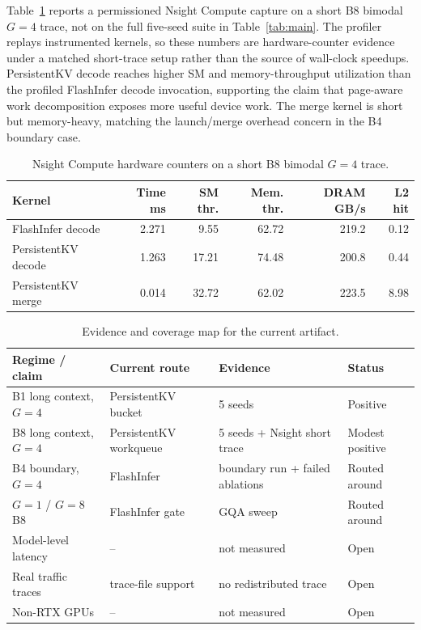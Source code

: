 \documentclass[10pt]{article}
\begin{document}
Table~\ref{tab:nsight} reports a permissioned Nsight Compute capture on a short
B8 bimodal $G=4$ trace, not on the full five-seed suite in
Table~\ref{tab:main}. The profiler replays instrumented kernels, so these
numbers are hardware-counter evidence under a matched short-trace setup rather
than the source of wall-clock speedups. PersistentKV decode reaches higher SM
and memory-throughput utilization than the profiled FlashInfer decode
invocation, supporting the claim that page-aware work decomposition exposes
more useful device work. The merge kernel is short but memory-heavy, matching
the launch/merge overhead concern in the B4 boundary case.

\begin{table}[t]
\centering
\caption{Nsight Compute hardware counters on a short B8 bimodal $G=4$ trace.}
\label{tab:nsight}
\small
\begin{tabular}{lrrrrr}
\toprule
Kernel & Time ms & SM thr. & Mem. thr. & DRAM GB/s & L2 hit \\
\midrule
FlashInfer decode & 2.271 & 9.55 & 62.72 & 219.2 & 0.12 \\
PersistentKV decode & 1.263 & 17.21 & 74.48 & 200.8 & 0.44 \\
PersistentKV merge & 0.014 & 32.72 & 62.02 & 223.5 & 8.98 \\
\bottomrule
\end{tabular}
\end{table}

\begin{table}[t]
\centering
\caption{Evidence and coverage map for the current artifact.}
\label{tab:coverage}
\small
\begin{tabular}{llll}
\toprule
Regime / claim & Current route & Evidence & Status \\
\midrule
B1 long context, $G=4$ & PersistentKV bucket & 5 seeds & Positive \\
B8 long context, $G=4$ & PersistentKV workqueue & 5 seeds + Nsight short trace & Modest positive \\
B4 boundary, $G=4$ & FlashInfer & boundary run + failed ablations & Routed around \\
$G=1$ / $G=8$ B8 & FlashInfer gate & GQA sweep & Routed around \\
Model-level latency & -- & not measured & Open \\
Real traffic traces & trace-file support & no redistributed trace & Open \\
Non-RTX GPUs & -- & not measured & Open \\
\bottomrule
\end{tabular}
\end{table}
\end{document}
